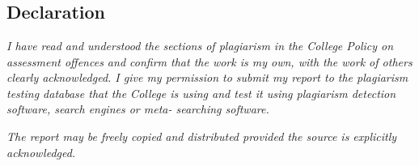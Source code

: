\documentclass[12pt, twoside, a4paper]{report}
\begin{document}

\chapter*{}

\vfill
\section*{Declaration}
\textit{I have read and understood the sections of plagiarism in the College Policy on assessment offences and confirm that the work is my own, with the work of others clearly acknowledged. I give my permission to submit my report to the plagiarism testing database that the College is using and test it using plagiarism detection software, search engines or meta- searching software.}

\textit{The report may be freely copied and distributed provided the source is explicitly acknowledged.}
\vfill

\cleardoublepage



\tableofcontents
\thispagestyle{empty}
\cleardoublepage
    
\setcounter{page}{1}






\printbibliography[heading=bibintoc,
title={References}]
\end{document}
